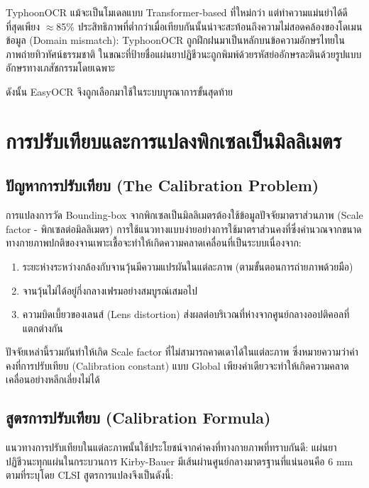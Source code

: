 TyphoonOCR แม้จะเป็นโมเดลแบบ Transformer-based ที่ใหม่กว่า แต่ทำความแม่นยำได้ดีที่สุดเพียง $\approx$85\% ประสิทธิภาพที่ต่ำกว่าเมื่อเทียบกันนั้นน่าจะสะท้อนถึงความไม่สอดคล้องของโดเมนข้อมูล (Domain mismatch): TyphoonOCR ถูกฝึกฝนมาเป็นหลักบนข้อความอักษรไทยในภาพถ่ายทิวทัศน์ธรรมชาติ ในขณะที่ป้ายชื่อแผ่นยาปฏิชีวนะถูกพิมพ์ด้วยรหัสย่ออักษรละตินด้วยรูปแบบอักษรทางเภสัชกรรมโดยเฉพาะ

ดังนั้น EasyOCR จึงถูกเลือกมาใช้ในระบบบูรณาการขั้นสุดท้าย

\section{การปรับเทียบและการแปลงพิกเซลเป็นมิลลิเมตร}
\label{sec:calibration}

\subsection{ปัญหาการปรับเทียบ (The Calibration Problem)}

การแปลงการวัด Bounding-box จากพิกเซลเป็นมิลลิเมตรต้องใช้ข้อมูลปัจจัยมาตราส่วนภาพ (Scale factor - พิกเซลต่อมิลลิเมตร)
การใช้แนวทางแบบง่ายอย่างการใช้มาตราส่วนคงที่ซึ่งคำนวณจากขนาดทางกายภาพปกติของจานเพาะเชื้อจะทำให้เกิดความคลาดเคลื่อนที่เป็นระบบเนื่องจาก:

\begin{enumerate}
  \item ระยะห่างระหว่างกล้องกับจานวุ้นมีความแปรผันในแต่ละภาพ (ตามขั้นตอนการถ่ายภาพด้วยมือ)
  \item จานวุ้นไม่ได้อยู่กึ่งกลางเฟรมอย่างสมบูรณ์เสมอไป
  \item ความบิดเบี้ยวของเลนส์ (Lens distortion) ส่งผลต่อบริเวณที่ห่างจากศูนย์กลางออปติคอลที่แตกต่างกัน
\end{enumerate}

ปัจจัยเหล่านี้รวมกันทำให้เกิด Scale factor ที่ไม่สามารถคาดเดาได้ในแต่ละภาพ ซึ่งหมายความว่าค่าคงที่การปรับเทียบ (Calibration constant) แบบ Global เพียงค่าเดียวจะทำให้เกิดความคลาดเคลื่อนอย่างหลีกเลี่ยงไม่ได้

\subsection{สูตรการปรับเทียบ (Calibration Formula)}

แนวทางการปรับเทียบในแต่ละภาพนั้นใช้ประโยชน์จากค่าคงที่ทางกายภาพที่ทราบกันดี: แผ่นยาปฏิชีวนะทุกแผ่นในกระบวนการ Kirby-Bauer มีเส้นผ่านศูนย์กลางมาตรฐานที่แน่นอนคือ 6 mm ตามที่ระบุโดย CLSI \cite{clsi2025}
สูตรการแปลงจึงเป็นดังนี้:

